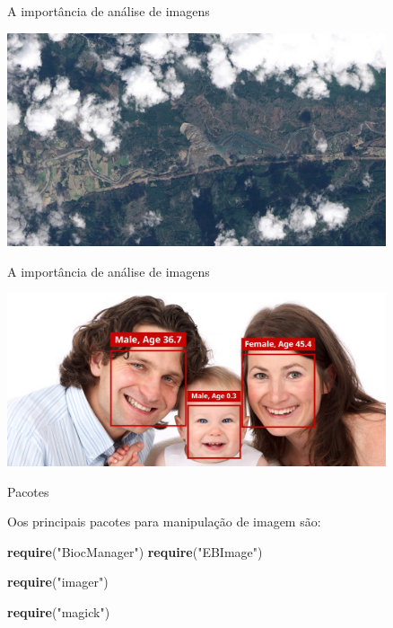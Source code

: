 \documentclass[
  ignorenonframetext,
]{beamer}
\newenvironment{Shaded}{\begin{snugshade}}{\end{snugshade}}
\newcommand{\KeywordTok}[1]{\textcolor[rgb]{0.13,0.29,0.53}{\textbf{#1}}}
\newcommand{\NormalTok}[1]{#1}
\newcommand{\StringTok}[1]{\textcolor[rgb]{0.31,0.60,0.02}{#1}}
\begin{document}
\begin{frame}{A importância de análise de imagens}
\protect\hypertarget{a-importuxe2ncia-de-anuxe1lise-de-imagens-1}{}

\small

\includegraphics[width=4.4in]{IMAGENS/satelite}

\begin{center}
\tiny{}
\end{center}

\end{frame}

\begin{frame}{A importância de análise de imagens}
\protect\hypertarget{a-importuxe2ncia-de-anuxe1lise-de-imagens-2}{}

\small

\includegraphics[width=4.4in]{IMAGENS/facial}

\begin{center}
\tiny{}
\end{center}

\end{frame}

\begin{frame}[fragile]{Pacotes}
\protect\hypertarget{pacotes}{}

\small

Oos principais pacotes para manipulação de imagem são:

\begin{Shaded}
\begin{Highlighting}[]
\KeywordTok{require}\NormalTok{(}\StringTok{"BiocManager"}\NormalTok{) }
\KeywordTok{require}\NormalTok{(}\StringTok{"EBImage"}\NormalTok{) }

\KeywordTok{require}\NormalTok{(}\StringTok{"imager"}\NormalTok{) }

\KeywordTok{require}\NormalTok{(}\StringTok{"magick"}\NormalTok{) }
\end{Highlighting}
\end{Shaded}

\end{frame}
\end{document}
